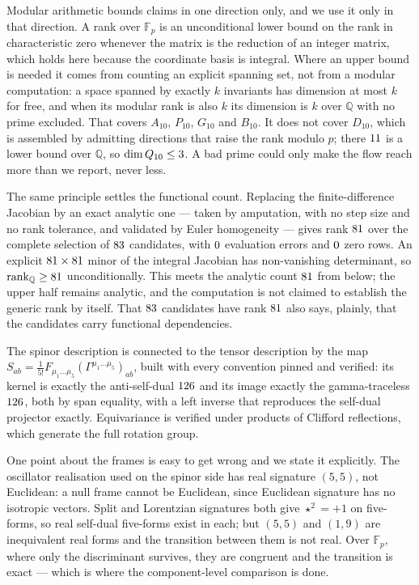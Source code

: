 \documentclass[aps,prl,reprint,superscriptaddress,nofootinbib,floatfix]{revtex4-2}
\begin{document}
Modular arithmetic bounds claims in one direction only, and we use it only in
that direction. A rank over $\mathbb{F}_p$ is an unconditional lower bound on the
rank in characteristic zero whenever the matrix is the reduction of an integer
matrix, which holds here because the coordinate basis is integral. Where an
upper bound is needed it comes from counting an explicit spanning set, not from
a modular computation: a space spanned by exactly $k$ invariants has dimension at
most $k$ for free, and when its modular rank is also $k$ its dimension is $k$
over $\mathbb{Q}$ with no prime excluded. That covers $A_{10}$, $P_{10}$,
$G_{10}$ and $B_{10}$. It does not cover $D_{10}$, which is assembled by
admitting directions that raise the rank modulo $p$; there $11$ is a lower
bound over $\mathbb{Q}$, so $\dim Q_{10} \le 3$. A bad prime could only
make the flow reach more than we report, never less.

The same principle settles the functional count. Replacing the finite-difference
Jacobian by an exact analytic one --- taken by amputation, with no step size and
no rank tolerance, and validated by Euler homogeneity --- gives rank
$81$ over the complete selection of $83$ candidates,
with $0$ evaluation errors and $0$ zero rows. An
explicit $81\times81$ minor of the integral Jacobian has
non-vanishing determinant, so $\mathrm{rank}_{\mathbb{Q}} \ge
81$ unconditionally. This meets the analytic count
$81$ from below; the upper half remains analytic, and the
computation is not claimed to establish the generic rank by itself. That
$83$ candidates have rank $81$ also says, plainly, that the
candidates carry functional dependencies.

The spinor description is connected to the tensor description by the map
$S_{ab} = \tfrac{1}{5!}F_{\mu_1\ldots\mu_5}(\Gamma^{\mu_1\ldots\mu_5})_{ab}$,
built with every convention pinned and verified: its kernel is exactly the
anti-self-dual $126$ and its image exactly the gamma-traceless
$126$, both by span equality, with a left inverse that reproduces
the self-dual projector exactly. Equivariance is verified under products of
Clifford reflections, which generate the full rotation group.

One point about the frames is easy to get wrong and we state it explicitly. The
oscillator realisation used on the spinor side has real signature $(5,5)$, not
Euclidean: a null frame cannot be Euclidean, since Euclidean signature has no
isotropic vectors. Split and Lorentzian signatures both give $\star^2=+1$ on
five-forms, so real self-dual five-forms exist in each; but $(5,5)$ and $(1,9)$
are inequivalent real forms and the transition between them is not real. Over
$\mathbb{F}_p$, where only the discriminant survives, they are congruent and the
transition is exact --- which is where the component-level comparison is done.
\end{document}
